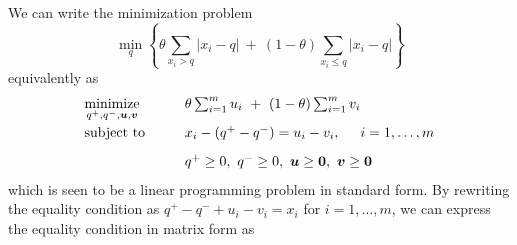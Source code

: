 
We can write the minimization problem
\begin{equation*}
  \min_q \left\{
    \theta \sum_{ x_{i} > q } |x_{i} - q| ~+~
    (1 - \theta) \sum_{ x_{i} \leq q } |x_{i} - q|
  \right\}
\end{equation*}
equivalently as
\begin{equation*}
  \arraycolsep=5mm
  \begin{array}{ll}
    \displaystyle
    \minimize_{q^{+}, q^{-}, \vec{u}, \vec{v}}
    & \theta \sum_{i=1}^m u_i ~+~
      (1 - \theta) \sum_{i=1}^m v_i \\[2ex]
    \text{subject to}
    & x_i - (q^{+} - q^{-}) = u_i - v_i, \hspace{5mm} i = 1, \dots, m \\[2ex]
    & q^{+} \geq 0,~ q^{-} \geq 0,~ \vec{u} \geq \vec{0},~ \vec{v} \geq \vec{0} \\
  \end{array}
\end{equation*}
which is seen to be a linear programming problem in standard form.  By rewriting
the equality condition as $q^{+} - q^{-} + u_i - v_i = x_i$ for $i=1, \dots, m$,
we can express the equality condition in matrix form as
